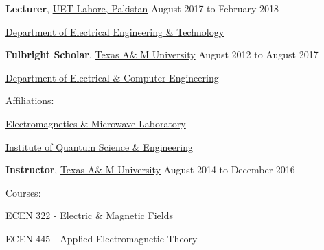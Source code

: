\documentclass[10pt]{article}
\newcommand{\halfblankline}{\quad\vspace{-0.5\baselineskip}\pagebreak[3]}
\begin{document}
\textbf{Lecturer},
            \href{http://www.uet.edu.pk/}{UET Lahore, Pakistan}
            \hfill {August 2017 to February 2018}
\begin{innerlist}

    \item[] \href{http://www.uet.edu.pk/faculties/facultiesinfo/department?RID=introduction&id=30}{Department of Electrical Engineering \& Technology}
\end{innerlist}
            
\halfblankline

\textbf{Fulbright Scholar},
            \href{http://www.tamu.edu/}{Texas A\& M University}
            \hfill {August 2012 to August 2017}
\begin{innerlist}

    \item[] \href{http://engineering.tamu.edu/electrical}{Department of Electrical \& Computer Engineering}
    \begin{innerlist}
        \item Affiliations:
            \begin{innerlist}
                \item[] \href{http://ee.tamu.edu/~eml/}{Electromagnetics \& Microwave Laboratory}
                \item[] \href{http://iqse.tamu.edu/}{Institute of Quantum Science \& Engineering}
            \end{innerlist}
    \end{innerlist}

\end{innerlist}


\halfblankline

\textbf{Instructor},
            \href{http://www.tamu.edu/}{Texas A\& M University}
            \hfill {August 2014 to December 2016}
\begin{innerlist}
        \item Courses:
            \begin{innerlist}
                \item[] {ECEN 322 - Electric \& Magnetic Fields}
                \item[] {ECEN 445 - Applied Electromagnetic Theory}
            \end{innerlist}
\end{innerlist}

\halfblankline
\end{document}
